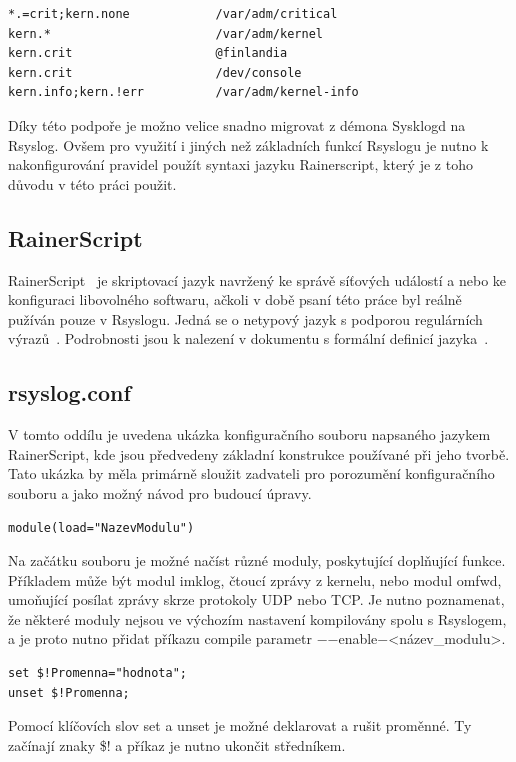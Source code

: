 \documentclass[thesis=B,czech]{FITthesis}[2012/06/26]
\begin{document}
\begin{lstlisting}[style=AshStyle]
*.=crit;kern.none            /var/adm/critical
kern.*                       /var/adm/kernel
kern.crit                    @finlandia
kern.crit                    /dev/console
kern.info;kern.!err          /var/adm/kernel-info
\end{lstlisting}

Díky této podpoře je možno velice snadno migrovat z démona Sysklogd na Rsyslog.
Ovšem pro využití i jiných než základních funkcí Rsyslogu je nutno k nakonfigurování pravidel použít syntaxi jazyku Rainerscript, který je z toho důvodu v této práci použit.

\subsection{RainerScript}
RainerScript~\cite{RainerScript} je skriptovací jazyk navržený ke správě síťových událostí a nebo ke konfiguraci libovolného softwaru, ačkoli v době psaní této práce byl reálně pužíván pouze v Rsyslogu.
Jedná se o netypový jazyk s podporou regulárních výrazů~\cite{RainerScriptPropertyReplacer}. Podrobnosti jsou k nalezení v dokumentu s formální definicí jazyka~\cite{RainerScriptFormalDefinition}.

\subsection{rsyslog.conf}
V tomto oddílu je uvedena ukázka konfiguračního souboru napsaného jazykem RainerScript, kde jsou předvedeny základní konstrukce používané při jeho tvorbě. Tato ukázka by měla primárně sloužit zadvateli pro porozumění konfiguračního souboru a jako možný návod pro budoucí úpravy.

\begin{lstlisting}[style=RainerScriptSimpleStyle]
module(load="NazevModulu")
\end{lstlisting}
Na začátku souboru je možné načíst různé moduly, poskytující doplňující funkce. Příkladem může být modul imklog, čtoucí zprávy z kernelu, nebo modul omfwd, umoňující posílat zprávy skrze protokoly UDP nebo TCP. Je nutno poznamenat, že některé moduly nejsou ve výchozím nastavení kompilovány spolu s Rsyslogem, a je proto nutno přidat příkazu compile parametr $-$$-$enable$-$<název\_modulu>.

\begin{lstlisting}[style=RainerScriptSimpleStyle]
set $!Promenna="hodnota";
unset $!Promenna;
\end{lstlisting}
Pomocí klíčovích slov set a unset je možné deklarovat a rušit proměnné. Ty začínají znaky \$! a příkaz je nutno ukončit středníkem.
\end{document}

